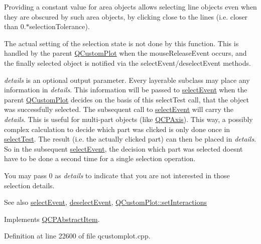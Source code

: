Providing a constant value for area objects allows selecting line objects even when they are obscured by such area objects, by clicking close to the lines (i.\+e. closer than 0.$\ast$selection\+Tolerance).

The actual setting of the selection state is not done by this function. This is handled by the parent \hyperlink{class_q_custom_plot}{Q\+Custom\+Plot} when the mouse\+Release\+Event occurs, and the finally selected object is notified via the select\+Event/deselect\+Event methods.

{\itshape details} is an optional output parameter. Every layerable subclass may place any information in {\itshape details}. This information will be passed to \hyperlink{class_q_c_p_abstract_item_aaf92af7b9893712959a6c073d334d88d}{select\+Event} when the parent \hyperlink{class_q_custom_plot}{Q\+Custom\+Plot} decides on the basis of this select\+Test call, that the object was successfully selected. The subsequent call to \hyperlink{class_q_c_p_abstract_item_aaf92af7b9893712959a6c073d334d88d}{select\+Event} will carry the {\itshape details}. This is useful for multi-\/part objects (like \hyperlink{class_q_c_p_axis}{Q\+C\+P\+Axis}). This way, a possibly complex calculation to decide which part was clicked is only done once in \hyperlink{class_q_c_p_item_ellipse_acd7e5f9528630b2ab5987e2a5782eb7c}{select\+Test}. The result (i.\+e. the actually clicked part) can then be placed in {\itshape details}. So in the subsequent \hyperlink{class_q_c_p_abstract_item_aaf92af7b9893712959a6c073d334d88d}{select\+Event}, the decision which part was selected doesn\textquotesingle{}t have to be done a second time for a single selection operation.

You may pass 0 as {\itshape details} to indicate that you are not interested in those selection details.

\begin{DoxySeeAlso}{See also}
\hyperlink{class_q_c_p_abstract_item_aaf92af7b9893712959a6c073d334d88d}{select\+Event}, \hyperlink{class_q_c_p_abstract_item_a91f090d6763cfedb0749219c63788ae9}{deselect\+Event}, \hyperlink{class_q_custom_plot_a5ee1e2f6ae27419deca53e75907c27e5}{Q\+Custom\+Plot\+::set\+Interactions} 
\end{DoxySeeAlso}


Implements \hyperlink{class_q_c_p_abstract_item_a96d522d10ffc0413b9a366c6f7f0476b}{Q\+C\+P\+Abstract\+Item}.



Definition at line 22600 of file qcustomplot.\+cpp.



